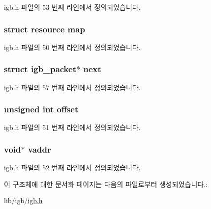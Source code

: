 igb.\+h 파일의 53 번째 라인에서 정의되었습니다.

\subsubsection[{\texorpdfstring{map}{map}}]{\setlength{\rightskip}{0pt plus 5cm}struct {\bf resource} map}\hypertarget{structigb__packet_a1134ed5d4a74917c76b796e82cd4206f}{}\label{structigb__packet_a1134ed5d4a74917c76b796e82cd4206f}


igb.\+h 파일의 50 번째 라인에서 정의되었습니다.

\subsubsection[{\texorpdfstring{next}{next}}]{\setlength{\rightskip}{0pt plus 5cm}struct {\bf igb\+\_\+packet}$\ast$ next}\hypertarget{structigb__packet_a1a20432d28f575630a2562c1c728a40f}{}\label{structigb__packet_a1a20432d28f575630a2562c1c728a40f}


igb.\+h 파일의 57 번째 라인에서 정의되었습니다.

\subsubsection[{\texorpdfstring{offset}{offset}}]{\setlength{\rightskip}{0pt plus 5cm}unsigned int offset}\hypertarget{structigb__packet_a29b5297d3393519050e3126c4cb07c1c}{}\label{structigb__packet_a29b5297d3393519050e3126c4cb07c1c}


igb.\+h 파일의 51 번째 라인에서 정의되었습니다.

\subsubsection[{\texorpdfstring{vaddr}{vaddr}}]{\setlength{\rightskip}{0pt plus 5cm}void$\ast$ vaddr}\hypertarget{structigb__packet_aa0bb68874ee9bcccfa45212ec3b12466}{}\label{structigb__packet_aa0bb68874ee9bcccfa45212ec3b12466}


igb.\+h 파일의 52 번째 라인에서 정의되었습니다.



이 구조체에 대한 문서화 페이지는 다음의 파일로부터 생성되었습니다.\+:\begin{DoxyCompactItemize}
\item 
lib/igb/\hyperlink{lib_2igb_2igb_8h}{igb.\+h}\end{DoxyCompactItemize}
